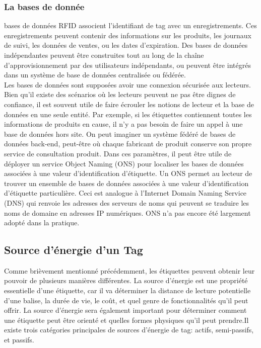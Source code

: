 \documentclass[11pt, a4paper, twoside]{book}
\begin{document}
\subsubsection{La bases de donnée}
bases de données RFID associent l'identifiant de tag avec un enregistrements. Ces enregistrements peuvent contenir des informations sur les produits, les journaux de suivi, les données de ventes, ou les dates d'expiration. Des bases de données indépendantes peuvent être construites tout au long de la chaîne d'approvisionnement par des utilisateurs indépendants, ou peuvent être intégrés dans un système de base de données centralisée ou fédérée.\\

Les bases de données sont supposées avoir une connexion sécurisée aux lecteurs. Bien qu'il existe des scénarios où les lecteurs peuvent ne pas être dignes de confiance, il est souvent utile de faire écrouler les notions de lecteur et la base de données en une seule entité. Par exemple, si les étiquettes contiennent toutes les informations de produits en cause, il n'y a pas besoin de faire un appel à une base de données hors site.
On peut imaginer un système fédéré de bases de données back-end, peut-être où chaque fabricant de produit conserve son propre service de consultation produit. Dans ces paramètres, il peut être utile de déployer un service Object Naming (ONS) pour localiser les bases de données associées à une valeur d'identification d'étiquette. Un ONS permet au lecteur de trouver un ensemble de bases de données associées à une valeur d'identification d'étiquette particulière. Ceci est analogue à l'Internet Domain Naming Service (DNS) qui renvoie les adresses des serveurs de noms qui peuvent se traduire les noms de domaine en adresses IP numériques. ONS n'a pas encore été largement adopté dans la pratique.
\subsection{Source d'énergie d'un Tag}
Comme brièvement mentionné précédemment, les étiquettes peuvent obtenir leur pouvoir de plusieurs manières différentes. La source d'énergie est une propriété essentielle d'une étiquette, car il va déterminer la distance de lecture potentielle d'une balise, la durée de vie, le coût, et quel genre de fonctionnalités qu'il peut offrir. La source d'énergie sera également important pour déterminer comment une étiquette peut être orienté et quelles formes physiques qu'il peut prendre.Il existe trois catégories principales de sources d'énergie de tag: actifs, semi-passifs, et passifs.\\
\end{document}
